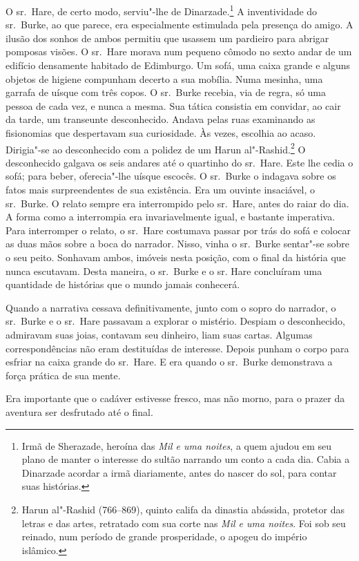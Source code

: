 O sr.~Hare, de certo modo, serviu"-lhe de Dinarzade.\footnote{ Irmã de
Sherazade, heroína das \textit{Mil e uma noites}, a quem ajudou em seu
plano de manter o interesse do sultão narrando um conto a cada dia. Cabia
a Dinarzade acordar a irmã diariamente, antes do nascer do sol, para
contar suas histórias.} A inventividade do sr.~Burke, ao que
parece, era especialmente estimulada pela presença do amigo. A ilusão dos
sonhos de ambos permitiu que usassem um pardieiro para abrigar pomposas
visões. O sr.~Hare morava num pequeno cômodo no sexto andar de um edifício
densamente habitado de Edimburgo. Um sofá, uma caixa grande e alguns
objetos de higiene compunham decerto a sua mobília. Numa mesinha, uma
garrafa de uísque com três copos. O sr.~Burke recebia, via de regra, só
uma pessoa de cada vez, e nunca a mesma. Sua tática consistia em convidar,
ao cair da tarde, um transeunte desconhecido. Andava pelas ruas examinando
as fisionomias que despertavam sua curiosidade. Às vezes, escolhia ao
acaso. Dirigia"-se ao desconhecido com a polidez de um
Harun al"-Rashid.\footnote{ Harun al"-Rashid (766--869), quinto califa da
dinastia abássida, protetor das letras e das artes, retratado com sua
corte nas \textit{Mil e uma noites}. Foi sob seu reinado, num período de
grande prosperidade, o apogeu do império islâmico.} O
desconhecido galgava os seis andares até o quartinho do sr.~Hare. Este lhe
cedia o sofá; para beber, oferecia"-lhe uísque escocês. O sr.~Burke o
indagava sobre os fatos mais surpreendentes de sua existência. Era um
ouvinte insaciável, o sr.~Burke. O relato sempre era interrompido pelo sr.~Hare, 
antes do raiar do dia. A forma como a interrompia era
invariavelmente igual, e bastante imperativa. Para interromper o relato,
o sr.~Hare costumava passar por trás do sofá
e colocar as duas mãos sobre a boca do narrador. Nisso, vinha o sr.~Burke
sentar"-se sobre o seu peito. Sonhavam ambos, imóveis nesta posição, com o
final da história que nunca escutavam. Desta maneira, o sr.~Burke e o sr.
Hare concluíram uma quantidade de histórias que o mundo jamais conhecerá.

Quando a narrativa cessava definitivamente, junto com o sopro do narrador,
o sr.~Burke e o sr.~Hare passavam a explorar o mistério. Despiam o
desconhecido, admiravam suas joias, contavam seu dinheiro, liam suas
cartas. Algumas correspondências não eram destituídas de interesse. Depois
punham o corpo para esfriar na caixa grande do sr.~Hare. E era quando o
sr.~Burke demonstrava a força prática de sua mente.

Era importante que o cadáver estivesse fresco, mas não morno, para o prazer
da aventura ser desfrutado até o final.

